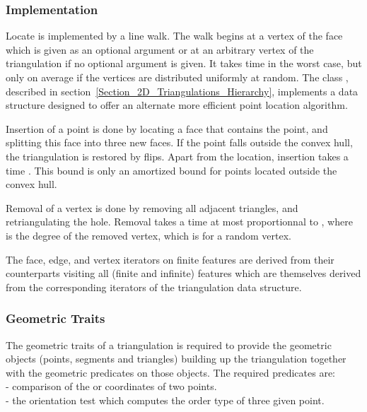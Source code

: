 \subsubsection{Implementation}

Locate is implemented by a line walk. The walk
begins  at  a vertex of the face which
is given
as an optional argument  or at an arbitrary vertex of the triangulation
 if no optional argument is given. It takes
time  in the worst case, but only 
on average if the vertices are distributed uniformly at random.
The class ,
described in section~\ref{Section_2D_Triangulations_Hierarchy}, 
implements a data structure  designed to
offer an alternate  more efficient point location algorithm.

Insertion of a point is done by locating a face that contains the
point, and splitting this face into three new faces.
If the point falls outside the convex hull, the triangulation
 is restored by flips.  Apart from the location, insertion takes a
time . This bound is only an amortized bound
for points located outside the convex hull.

Removal of a vertex is done by removing all adjacent triangles, and
retriangulating the hole. Removal takes a time  at most proportionnal to
, where
  is the degree of the removed vertex,
which is  for a random vertex.

The face, edge, and vertex iterators on finite features
are derived from their counterparts visiting all (finite and infinite)
features which are themselves derived from the corresponding iterators
of the triangulation data structure.


\subsubsection{ Geometric Traits}
\label{Subsubsection_2D_Triangulation_Basic_Geometric_Traits}

The geometric traits of a triangulation 
 is required to provide
the geometric objects (points, segments and triangles)
building up the triangulation
together with the geometric predicates on those objects.
The required predicates are: \\
- comparison of the  or  coordinates of two points.\\
- the orientation test which computes 
  the order type of three given point.

